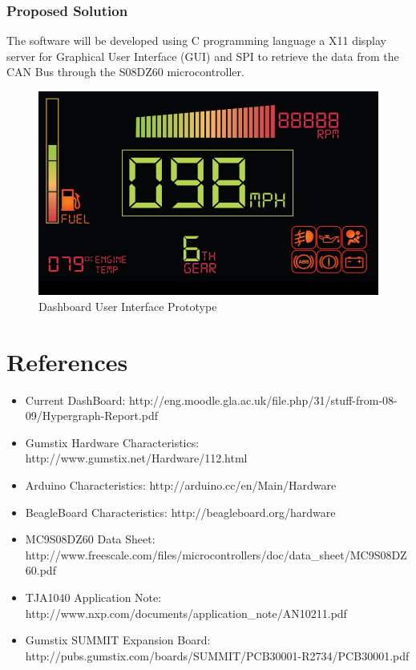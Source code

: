 \documentclass[11pt,a4wide]{article}
\begin{document}
\subsubsection{Proposed Solution}
The software will be developed using C programming language a X11 display server for Graphical User Interface (GUI) and SPI to retrieve the data from the CAN Bus through the S08DZ60 microcontroller.

\begin{figure}[H]
\centering
\includegraphics[scale=0.5]{dashboard-1_800x480.jpg}
\caption{Dashboard User Interface Prototype}
\label{fig:dash_proto}
\end{figure}

\section{References}
\begin{itemize}
	\item Current DashBoard: http://eng.moodle.gla.ac.uk/file.php/31/stuff-from-08-09/Hypergraph-Report.pdf
	\item Gumstix Hardware Characteristics: http://www.gumstix.net/Hardware/112.html
	\item Arduino Characteristics: http://arduino.cc/en/Main/Hardware
	\item BeagleBoard Characteristics: http://beagleboard.org/hardware
	\item MC9S08DZ60 Data Sheet: \\
http://www.freescale.com/files/microcontrollers/doc/data\_sheet/MC9S08DZ60.pdf
	\item TJA1040 Application Note: http://www.nxp.com/documents/application\_note/AN10211.pdf
	\item Gumstix SUMMIT Expansion Board: http://pubs.gumstix.com/boards/SUMMIT/PCB30001-R2734/PCB30001.pdf
\end{itemize}
\end{document}
